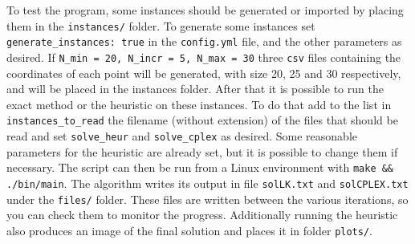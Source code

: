 To test the program, some instances should be generated or imported by placing them in the \texttt{instances/} folder. To generate some instances set \texttt{generate\_instances: true} in the \texttt{config.yml} file, and the other parameters as desired. If \texttt{N\_min = 20, N\_incr = 5, N\_max = 30} three \texttt{csv} files containing the coordinates of each point will be generated, with size 20, 25 and 30 respectively, and will be placed in the instances folder. After that it is possible to run the exact method or the heuristic on these instances. To do that add to the list in \texttt{instances\_to\_read} the filename (without extension) of the files that should be read and set \texttt{solve\_heur} and \texttt{solve\_cplex} as desired. Some reasonable parameters for the heuristic are already set, but it is possible to change them if necessary. The script can then be run from a Linux environment with \texttt{make \&\& ./bin/main}. The algorithm writes its output in file \texttt{solLK.txt} and \texttt{solCPLEX.txt} under the \texttt{files/} folder. These files are written between the various iterations, so you can check them to monitor the progress. Additionally running the heuristic also produces an image of the final solution and places it in folder \texttt{plots/}.\\


